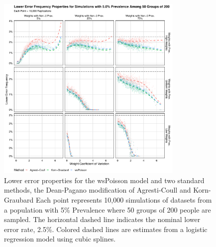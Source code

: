 \documentclass[AMA,STIX1COL]{WileyNJD-v2}
\begin{document}
\begin{figure}
\centering
\includegraphics[width=0.8\textwidth]{figures/perfect_lower_error_frequency_50_groups_0_05_prev.pdf}
\caption{Lower error properties for the wsPoisson model and two standard methods, the Dean-Pagano modification of Agresti-Coull and Korn-Graubard
Each point represents 10,000 simulations of datasets from a population with 5\% Prevalence where 50 groups of 200 people are sampled.
The horizontal dashed line indicates the nominal lower error rate, 2.5\%.
Colored dashed lines are estimates from a logistic regression model using cubic splines.}
\label{fig:perfect_lower_error_frequency_50_groups_0_05_prev}
\end{figure}
\end{document}
